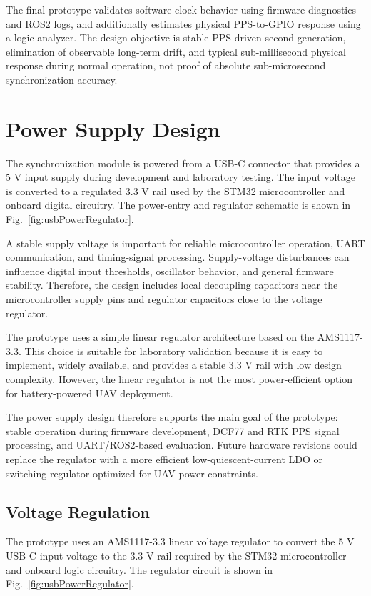 The final prototype validates software-clock behavior using firmware diagnostics and ROS2 logs, and additionally estimates physical PPS-to-GPIO response using a logic analyzer. The design objective is stable PPS-driven second generation, elimination of observable long-term drift, and typical sub-millisecond physical response during normal operation, not proof of absolute sub-microsecond synchronization accuracy.

\section{Power Supply Design}

The synchronization module is powered from a USB-C connector that provides a 5 V input supply during development and laboratory testing. The input voltage is converted to a regulated 3.3 V rail used by the STM32 microcontroller and onboard digital circuitry. The power-entry and regulator schematic is shown in Fig.~\ref{fig:usbPowerRegulator}.

A stable supply voltage is important for reliable microcontroller operation, UART communication, and timing-signal processing. Supply-voltage disturbances can influence digital input thresholds, oscillator behavior, and general firmware stability. Therefore, the design includes local decoupling capacitors near the microcontroller supply pins and regulator capacitors close to the voltage regulator.

The prototype uses a simple linear regulator architecture based on the AMS1117-3.3. This choice is suitable for laboratory validation because it is easy to implement, widely available, and provides a stable 3.3 V rail with low design complexity. However, the linear regulator is not the most power-efficient option for battery-powered UAV deployment.

The power supply design therefore supports the main goal of the prototype: stable operation during firmware development, DCF77 and RTK PPS signal processing, and UART/ROS2-based evaluation. Future hardware revisions could replace the regulator with a more efficient low-quiescent-current LDO or switching regulator optimized for UAV power constraints.

\subsection{Voltage Regulation}

The prototype uses an AMS1117-3.3 linear voltage regulator \cite{ams1117Datasheet} to convert the 5 V USB-C input voltage to the 3.3 V rail required by the STM32 microcontroller and onboard logic circuitry. The regulator circuit is shown in Fig.~\ref{fig:usbPowerRegulator}.

